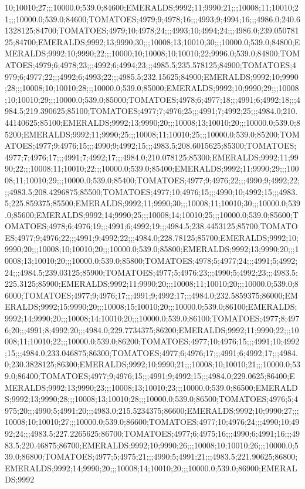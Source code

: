 10;10010;27;;;10000.0;539.0;84600;EMERALDS;9992;11;9990;21;;;10008;11;10010;21;;;10000.0;539.0;84600;TOMATOES;4979;9;4978;16;;;4993;9;4994;16;;;4986.0;240.61328125;84700;TOMATOES;4979;10;4978;24;;;4993;10;4994;24;;;4986.0;239.05078125;84700;EMERALDS;9992;13;9990;30;;;10008;13;10010;30;;;10000.0;539.0;84800;EMERALDS;9992;10;9990;22;;;10000;10;10008;10;10010;22;9996.0;539.0;84800;TOMATOES;4979;6;4978;23;;;4992;6;4994;23;;;4985.5;235.578125;84900;TOMATOES;4979;6;4977;22;;;4992;6;4993;22;;;4985.5;232.15625;84900;EMERALDS;9992;10;9990;28;;;10008;10;10010;28;;;10000.0;539.0;85000;EMERALDS;9992;10;9990;29;;;10008;10;10010;29;;;10000.0;539.0;85000;TOMATOES;4978;6;4977;18;;;4991;6;4992;18;;;4984.5;219.390625;85100;TOMATOES;4977;7;4976;25;;;4991;7;4992;25;;;4984.0;210.44140625;85100;EMERALDS;9992;13;9990;20;;;10008;13;10010;20;;;10000.0;539.0;85200;EMERALDS;9992;11;9990;25;;;10008;11;10010;25;;;10000.0;539.0;85200;TOMATOES;4977;9;4976;15;;;4990;9;4992;15;;;4983.5;208.6015625;85300;TOMATOES;4977;7;4976;17;;;4991;7;4992;17;;;4984.0;210.078125;85300;EMERALDS;9992;11;9990;22;;;10008;11;10010;22;;;10000.0;539.0;85400;EMERALDS;9992;11;9990;29;;;10008;11;10010;29;;;10000.0;539.0;85400;TOMATOES;4977;9;4976;22;;;4990;9;4992;22;;;4983.5;208.4296875;85500;TOMATOES;4977;10;4976;15;;;4990;10;4992;15;;;4983.5;225.859375;85500;EMERALDS;9992;11;9990;30;;;10008;11;10010;30;;;10000.0;539.0;85600;EMERALDS;9992;14;9990;25;;;10008;14;10010;25;;;10000.0;539.0;85600;TOMATOES;4978;6;4976;19;;;4991;6;4992;19;;;4984.5;238.4453125;85700;TOMATOES;4977;9;4976;22;;;4991;9;4992;22;;;4984.0;228.78125;85700;EMERALDS;9992;10;9990;20;;;10008;10;10010;20;;;10000.0;539.0;85800;EMERALDS;9992;13;9990;20;;;10008;13;10010;20;;;10000.0;539.0;85800;TOMATOES;4978;5;4977;24;;;4991;5;4992;24;;;4984.5;239.03125;85900;TOMATOES;4977;5;4976;23;;;4990;5;4992;23;;;4983.5;225.3125;85900;EMERALDS;9992;11;9990;20;;;10008;11;10010;20;;;10000.0;539.0;86000;TOMATOES;4977;9;4976;17;;;4991;9;4992;17;;;4984.0;232.5859375;86000;EMERALDS;9992;15;9990;20;;;10008;15;10010;20;;;10000.0;539.0;86100;EMERALDS;9992;14;9990;20;;;10008;14;10010;20;;;10000.0;539.0;86100;TOMATOES;4977;8;4976;20;;;4991;8;4992;20;;;4984.0;229.7734375;86200;EMERALDS;9992;11;9990;22;;;10008;11;10010;22;;;10000.0;539.0;86200;TOMATOES;4977;10;4976;15;;;4991;10;4992;15;;;4984.0;233.046875;86300;TOMATOES;4977;6;4976;17;;;4991;6;4992;17;;;4984.0;230.3828125;86300;EMERALDS;9992;10;9990;21;;;10008;10;10010;21;;;10000.0;539.0;86400;TOMATOES;4977;9;4976;15;;;4991;9;4992;15;;;4984.0;229.0625;86400;EMERALDS;9992;13;9990;23;;;10008;13;10010;23;;;10000.0;539.0;86500;EMERALDS;9992;13;9990;28;;;10008;13;10010;28;;;10000.0;539.0;86500;TOMATOES;4976;5;4975;20;;;4990;5;4991;20;;;4983.0;215.5234375;86600;EMERALDS;9992;10;9990;27;;;10008;10;10010;27;;;10000.0;539.0;86600;TOMATOES;4977;10;4976;24;;;4990;10;4992;24;;;4983.5;227.2265625;86700;TOMATOES;4977;6;4975;16;;;4990;6;4991;16;;;4983.5;220.46875;86700;EMERALDS;9992;10;9990;26;;;10008;10;10010;26;;;10000.0;539.0;86800;TOMATOES;4977;5;4975;21;;;4990;5;4991;21;;;4983.5;221.90625;86800;EMERALDS;9992;14;9990;20;;;10008;14;10010;20;;;10000.0;539.0;86900;EMERALDS;9992